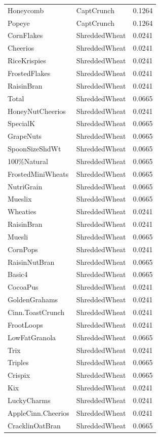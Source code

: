 \begin{longtable}{llr}
Honeycomb & CaptCrunch & 0.1264 \\
Popeye & CaptCrunch & 0.1264 \\
CornFlakes & ShreddedWheat & 0.0241 \\
Cheerios & ShreddedWheat & 0.0241 \\
RiceKrispies & ShreddedWheat & 0.0241 \\
FrostedFlakes & ShreddedWheat & 0.0241 \\
RaisinBran & ShreddedWheat & 0.0241 \\
Total & ShreddedWheat & 0.0665 \\
HoneyNutCheerios & ShreddedWheat & 0.0241 \\
SpecialK & ShreddedWheat & 0.0665 \\
GrapeNuts & ShreddedWheat & 0.0665 \\
SpoonSizeShdWt & ShreddedWheat & 0.0665 \\
100\%Natural & ShreddedWheat & 0.0665 \\
FrostedMiniWheats & ShreddedWheat & 0.0665 \\
NutriGrain & ShreddedWheat & 0.0665 \\
Mueslix & ShreddedWheat & 0.0665 \\
Wheaties & ShreddedWheat & 0.0241 \\
RaisinBran & ShreddedWheat & 0.0241 \\
Muesli & ShreddedWheat & 0.0665 \\
CornPops & ShreddedWheat & 0.0241 \\
RaisinNutBran & ShreddedWheat & 0.0665 \\
Basic4 & ShreddedWheat & 0.0665 \\
CocoaPus & ShreddedWheat & 0.0241 \\
GoldenGrahams & ShreddedWheat & 0.0241 \\
Cinn.ToastCrunch & ShreddedWheat & 0.0241 \\
FrootLoops & ShreddedWheat & 0.0241 \\
LowFatGranola & ShreddedWheat & 0.0665 \\
Trix & ShreddedWheat & 0.0241 \\
Triples & ShreddedWheat & 0.0665 \\
Crispix & ShreddedWheat & 0.0665 \\
Kix & ShreddedWheat & 0.0241 \\
LuckyCharms & ShreddedWheat & 0.0241 \\
AppleCinn.Cheerios & ShreddedWheat & 0.0241 \\
CracklinOatBran & ShreddedWheat & 0.0665 \\

\end{longtable}
